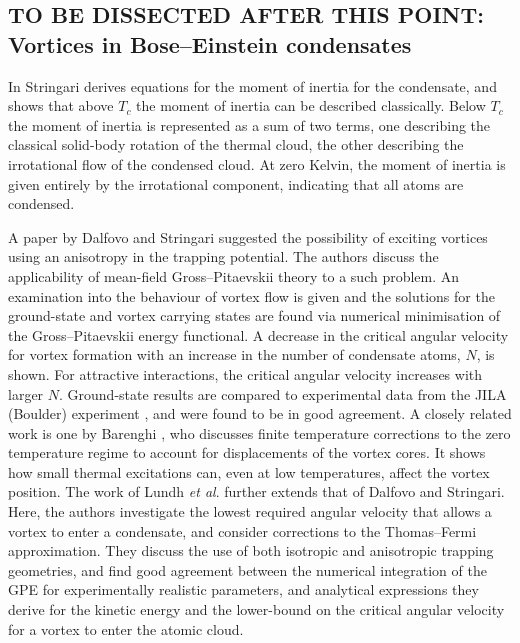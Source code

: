 \subsection{TO BE DISSECTED AFTER THIS POINT: Vortices in Bose--Einstein condensates}\label{ss:vorticesinbec}
In \cite{BEC:Stringari_prl_1996} Stringari derives equations for the moment of inertia for the condensate, and shows that above $T_c$ the moment of inertia can be described classically. Below $T_c$ the moment of inertia is represented as a sum of two terms, one describing the classical solid-body rotation of the thermal cloud, the other describing the irrotational flow of the condensed cloud.  At zero Kelvin, the moment of inertia is given entirely by the irrotational component, indicating that all atoms are condensed.

A paper by Dalfovo and Stringari \cite{Vtx:Dalfovo_pra_1996} suggested the possibility of exciting vortices using an anisotropy in the
trapping potential. The authors discuss the applicability of mean-field Gross--Pitaevskii theory to a such problem. An examination into the behaviour of vortex flow is given and the solutions for the ground-state and vortex carrying states are found via numerical minimisation of the Gross--Pitaevskii energy functional. A decrease in the critical angular velocity for vortex formation with an increase in the number of condensate atoms, $N$, is shown. For attractive interactions, the critical angular velocity increases with larger $N$. Ground-state results are compared to experimental data from the JILA (Boulder) experiment \cite{BEC:Cornell_science_1995}, and were found to be in good agreement. A closely related work is one by Barenghi \cite{Vtx:Barenghi_pra_1996}, who discusses finite temperature corrections to the zero temperature regime to account for displacements of the vortex cores. It shows how small thermal excitations can, even at low temperatures, affect the vortex position. The work of Lundh \textit{et al}. \cite{Vtx:Lundh_pra_1997} further extends that of Dalfovo and Stringari. Here, the authors investigate the lowest required angular velocity that allows a vortex to enter a condensate, and consider corrections to the Thomas--Fermi approximation. They discuss the use of both isotropic and anisotropic trapping geometries, and find good agreement between the numerical integration of the GPE for experimentally realistic parameters, and analytical expressions they derive for the kinetic energy and the lower-bound on the critical angular velocity for a vortex to enter the atomic cloud.

